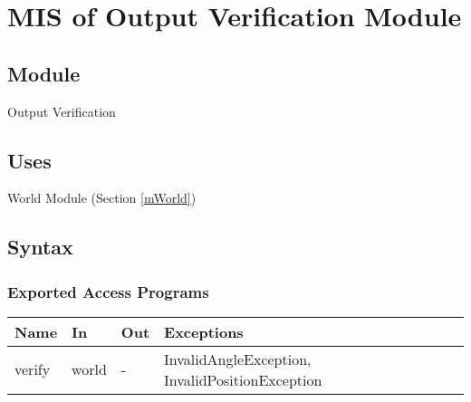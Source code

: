 \documentclass[12pt, titlepage]{article}
\begin{document}



\section{MIS of Output Verification Module} \label{mOutputVerification} 



\subsection{Module}

Output Verification


\subsection{Uses}

World Module (Section \ref{mWorld})

\subsection{Syntax}


\subsubsection{Exported Access Programs}

\begin{center}
\begin{tabular}{p{2cm} p{4cm} p{4cm} p{2cm}}
\hline
\textbf{Name} & \textbf{In} & \textbf{Out} & \textbf{Exceptions} \\
\hline
verify & world & - & InvalidAngleException, InvalidPositionException \\
\hline
\end{tabular}
\end{center}
\end{document}
